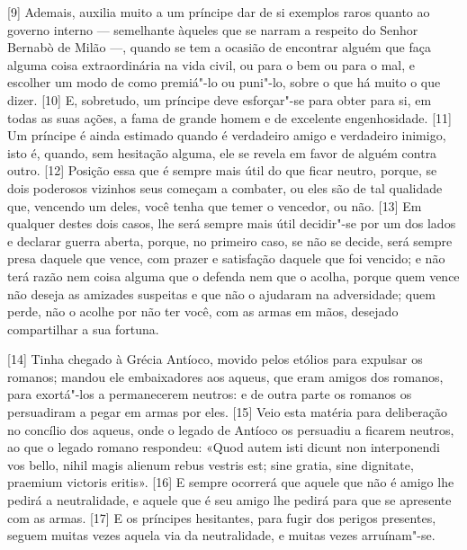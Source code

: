 {[}9{]} Ademais, auxilia muito a um príncipe dar de si exemplos raros
quanto ao governo interno --- semelhante àqueles que se narram a respeito
do Senhor Bernabò de Milão ---,
quando se tem a ocasião de encontrar alguém que faça alguma coisa
extraordinária na vida civil, ou para o bem ou para o mal, e escolher um
modo de como premiá"-lo ou puni"-lo, sobre o que há muito o que dizer.
{[}10{]} E, sobretudo, um príncipe deve esforçar"-se para obter para si,
em todas as suas ações, a fama de grande homem e de excelente
engenhosidade.
{[}11{]} Um príncipe é ainda estimado quando é verdadeiro amigo e
verdadeiro inimigo, isto é, quando, sem hesitação alguma, ele se revela
em favor de alguém contra outro. {[}12{]} Posição essa que é sempre mais
útil do que ficar neutro, porque, se dois poderosos vizinhos seus
começam a combater, ou eles são de tal qualidade que, vencendo um deles,
você tenha que temer o vencedor, ou não. {[}13{]} Em qualquer destes
dois casos, lhe será sempre mais útil decidir"-se por um dos lados e
declarar guerra aberta, porque, no primeiro caso, se não se decide, será
sempre presa daquele que vence, com prazer e satisfação daquele que foi
vencido; e não terá razão nem coisa alguma que o defenda nem que o
acolha, porque quem vence não deseja as amizades suspeitas e que não o
ajudaram na adversidade; quem perde, não o acolhe por não ter você, com
as armas em mãos, desejado compartilhar a sua fortuna.

{[}14{]} Tinha chegado à Grécia Antíoco, movido %
pelos etólios para expulsar os romanos; mandou ele embaixadores aos
aqueus, que eram amigos dos romanos, para exortá"-los a permanecerem
neutros: e de outra parte os romanos os persuadiram a pegar em armas por
eles. {[}15{]} Veio esta matéria para deliberação no concílio dos
aqueus, onde o legado de Antíoco os persuadiu a ficarem neutros, ao que
o legado romano respondeu: «Quod autem isti dicunt non interponendi vos
bello, nihil magis alienum rebus vestris est; sine gratia, sine
dignitate, praemium victoris eritis». {[}16{]} E sempre
ocorrerá que aquele que não é amigo lhe pedirá a neutralidade, e aquele
que é seu amigo lhe pedirá para que se apresente com as armas. {[}17{]}
E os príncipes hesitantes, para fugir dos perigos presentes, seguem
muitas vezes aquela via da neutralidade, e muitas vezes arruínam"-se.


